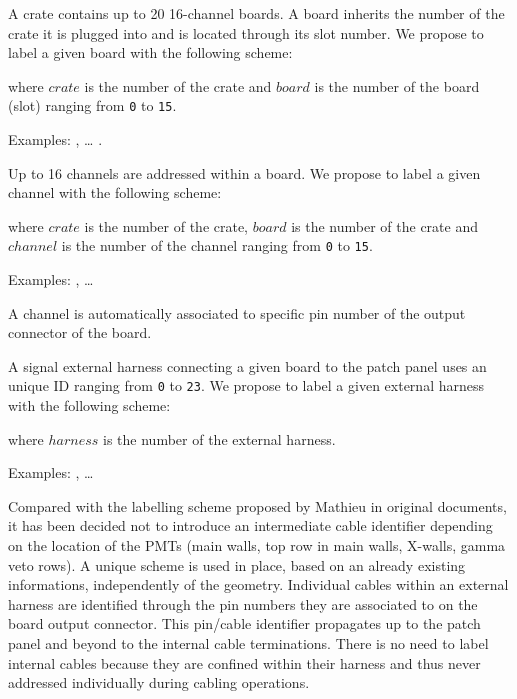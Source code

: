 \documentclass[12pt,a4paper]{article}
\begin{document}
 \vskip 10pt  A crate contains  up to  20 16-channel boards.   A board
 inherits the  number of the crate  it is plugged into  and is located
 through its slot number.  We propose  to label a given board with the
 following scheme:
\begin{center}
 \end{center}
where \texttt{$crate$} is the number of the crate and \texttt{$board$}
is  the  number  of  the  board  (slot)  ranging  from  \texttt{0}  to
\texttt{15}.
\vskip 10pt
\par\noindent Examples: ,  \dots
{}.

\vskip 10pt  \par\noindent Up  to 16 channels  are addressed  within a
board.  We propose to label a given channel with the following scheme:
\begin{center}
 \end{center}
where \texttt{$crate$} is the number of the crate, \texttt{$board$} is
the number  of the crate and  \texttt{$channel$} is the number  of the
channel  ranging   from  \texttt{0}  to   \texttt{15}.   \par\noindent
Examples: , \dots {}

\vskip  10pt A  channel is  automatically associated  to specific  pin
number of the output connector of the board.

\vskip 10pt A signal external harness  connecting a given board to the
patch panel uses an unique  ID ranging from \texttt{0} to \texttt{23}.
We  propose to  label  a  given external  harness  with the  following
scheme:
\begin{center}
 \end{center}
where \texttt{$harness$} is the number of the external harness.
\par\noindent Examples: , \dots
{}

\vskip 10pt Compared with the  labelling scheme proposed by Mathieu in
original  documents,  it   has  been  decided  not   to  introduce  an
intermediate cable  identifier depending on  the location of  the PMTs
(main walls,  top row  in main  walls, X-walls,  gamma veto  rows).  A
unique  scheme  is  used  in  place,  based  on  an  already  existing
informations, independently of the geometry.  Individual cables within
an external  harness are identified  through the pin numbers  they are
associated  to   on  the  board  output   connector.   This  pin/cable
identifier propagates up to the patch panel and beyond to the internal
cable terminations.  There is no need to label internal cables because
they  are  confined within  their  harness  and thus  never  addressed
individually during cabling operations.
\end{document}
